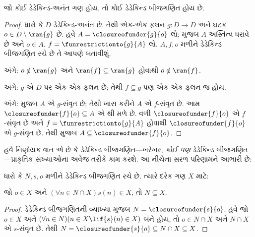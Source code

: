 \begin{thm}
જો કોઈ ડેડેકિન્ડ-અનંત ગણ હોય, તો કોઈ ડેડેકિન્ડ બીજગણિત હોય છે.
\end{thm}

\begin{proof}
ધારો કે $D$ ડેડેકિન્ડ-અનંત છે. તેથી એક-એક ફલન $g \colon D \to
D$ અને ઘટક $o \in D \setminus \ran{g}$ છે. હવે $A =
\closureofunder{g}{o}$ લો;  મુજબ $A$
અસ્તિત્વ ધરાવે છે અને $o \in A$. $f = \funrestrictionto{g}{A}$ લો.
$A, f, o$ મળીને ડેડેકિન્ડ બીજગણિત રચે છે તે આપણે બતાવીશું.

 અંગે: $o \notin \ran{g}$ અને $\ran{f}
\subseteq \ran{g}$ હોવાથી $o\notin \ran{f}$.

 અંગે: $g$ એ $D$ પર એક-એક ફલન છે; તેથી
$f \subseteq g$ પણ એક-એક ફલન જ હોય.

 અંગે:  મુજબ $A$ એ
$g$-સંવૃત છે; તેથી ખાસ કરીને $A$ એ $f$-સંવૃત છે. આમ
$\closureofunder{f}{o} \subseteq A$ એ થી મળે
છે. વળી $\closureofunder{f}{o}$ એ $f$-સંવૃત છે અને
$f = \funrestrictionto{g}{A}$ હોવાથી $\closureofunder{f}{o}$ એ
$g$-સંવૃત છે. તેથી  મુજબ
$A \subseteq \closureofunder{f}{o}$.
\end{proof}
\endgroup

\begingroup
\makeatletter{}\makeatother

\label{guunit:OLP-0052}


હવે નિર્ણાયક વાત એ છે કે ડેડેકિન્ડ બીજગણિત---ખરેખર, \emph{કોઈ પણ}
ડેડેકિન્ડ બીજગણિત---પ્રાકૃતિક સંખ્યાઓના અવેજ તરીકે કામ કરશે. આ નીચેના
સરળ પરિણામને આભારી છે:

\begin{thm}[ગાણિતિક આગમન]
ધારો કે $N, s, o$ મળીને ડેડેકિન્ડ બીજગણિત રચે છે. ત્યારે દરેક ગણ $X$ માટે:
	\begin{center}
		જો $o \in X$ અને $(\forall {n} \in N \cap X){s}({n}) \in X$, {તો} $N \subseteq X$.
	\end{center}
\end{thm}

\begin{proof}
ડેડેકિન્ડ બીજગણિતની વ્યાખ્યા મુજબ $N = \closureofunder{s}{o}$.
હવે જો ${o} \in X$ અને $(\forall {n} \in N)(n \in X \lif
{s}({n}) \in X)$ બંને હોય, તો $o\in N\cap X$ અને $N\cap X$ એ $s$-સંવૃત છે. તેથી $N = \closureofunder{s}{o} \subseteq N\cap X\subseteq X$.
\end{proof}

